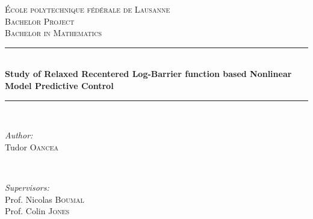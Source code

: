 \begin{titlepage}
\newcommand{\HRule}{\rule{\linewidth}{0.5mm}} %

\center %


\vspace{3cm}
\textsc{\LARGE École polytechnique fédérale de Lausanne}\\[1.5cm] %
\textsc{\Large Bachelor Project}\\[0.5cm] %
\textsc{\large Bachelor in Mathematics}\\[0.5cm] %


\begin{doublespace}
    \HRule \\[0.4cm]
    \huge \bfseries Study of Relaxed Recentered Log-Barrier function based Nonlinear Model Predictive Control\\[0.4cm]
    \HRule \\[1.5cm]
\end{doublespace}


\begin{minipage}{0.4\textwidth}
\begin{flushleft} \large
\emph{Author:}\\
Tudor \textsc{Oancea} %
\end{flushleft}
\end{minipage}
~
\begin{minipage}{0.4\textwidth}
\begin{flushright} \large
\emph{Supervisors:} \\
Prof. Nicolas \textsc{Boumal}\\
Prof. Colin \textsc{Jones}
\end{flushright}
\end{minipage}


\end{titlepage}
